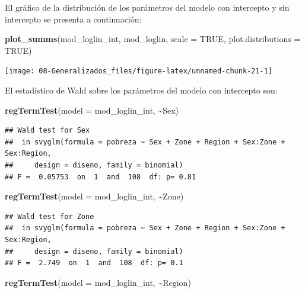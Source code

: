 \documentclass[
  12pt,
]{book}
\newenvironment{Shaded}{\begin{snugshade}}{\end{snugshade}}
\newcommand{\AttributeTok}[1]{\textcolor[rgb]{0.13,0.29,0.53}{#1}}
\newcommand{\ConstantTok}[1]{\textcolor[rgb]{0.56,0.35,0.01}{#1}}
\newcommand{\FunctionTok}[1]{\textcolor[rgb]{0.13,0.29,0.53}{\textbf{#1}}}
\newcommand{\NormalTok}[1]{#1}
\newcommand{\SpecialCharTok}[1]{\textcolor[rgb]{0.81,0.36,0.00}{\textbf{#1}}}
\begin{document}
El gráfico de la distribución de los parámetros del modelo con intercepto y sin intercepto se presenta a continuación:

\begin{Shaded}
\begin{Highlighting}[]
\FunctionTok{plot\_summs}\NormalTok{(mod\_loglin\_int, mod\_loglin, }\AttributeTok{scale =} \ConstantTok{TRUE}\NormalTok{, }\AttributeTok{plot.distributions =} \ConstantTok{TRUE}\NormalTok{)}
\end{Highlighting}
\end{Shaded}

\texttt{[image: 08-Generalizados\_files/figure-latex/unnamed-chunk-21-1]}

El estadístico de Wald sobre los parámetros del modelo con intercepto son:

\begin{Shaded}
\begin{Highlighting}[]
  \FunctionTok{regTermTest}\NormalTok{(}\AttributeTok{model =}\NormalTok{ mod\_loglin\_int, }\SpecialCharTok{\textasciitilde{}}\NormalTok{Sex)}
\end{Highlighting}
\end{Shaded}

\begin{verbatim}
## Wald test for Sex
##  in svyglm(formula = pobreza ~ Sex + Zone + Region + Sex:Zone + Sex:Region, 
##     design = diseno, family = binomial)
## F =  0.05753  on  1  and  108  df: p= 0.81
\end{verbatim}

\begin{Shaded}
\begin{Highlighting}[]
  \FunctionTok{regTermTest}\NormalTok{(}\AttributeTok{model =}\NormalTok{ mod\_loglin\_int, }\SpecialCharTok{\textasciitilde{}}\NormalTok{Zone)}
\end{Highlighting}
\end{Shaded}

\begin{verbatim}
## Wald test for Zone
##  in svyglm(formula = pobreza ~ Sex + Zone + Region + Sex:Zone + Sex:Region, 
##     design = diseno, family = binomial)
## F =  2.749  on  1  and  108  df: p= 0.1
\end{verbatim}

\begin{Shaded}
\begin{Highlighting}[]
  \FunctionTok{regTermTest}\NormalTok{(}\AttributeTok{model =}\NormalTok{ mod\_loglin\_int, }\SpecialCharTok{\textasciitilde{}}\NormalTok{Region)}
\end{Highlighting}
\end{Shaded}
\end{document}

